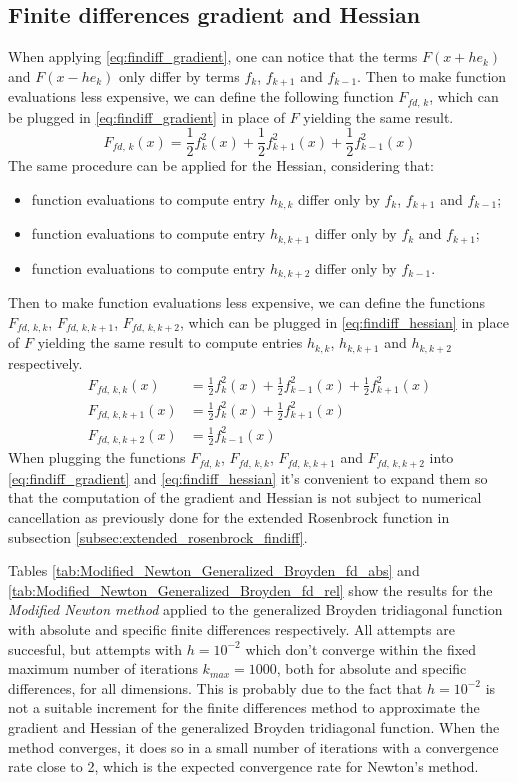 \subsection{Finite differences gradient and Hessian}

When applying \ref{eq:findiff_gradient}, one can notice that the terms $F(x + he_k)$ and $F(x-he_k)$ only differ by terms $f_k$, $f_{k+1}$ and $f_{k-1}$.
Then to make function evaluations less expensive, we can define the following function $F_{\textit{fd},\,k}$, which can be plugged in \ref{eq:findiff_gradient} in place of $F$ yielding the same result.
\[
F_{\textit{fd},\,k}(x) = \frac12 f_k^2(x) + \frac12 f_{k+1}^2(x) + \frac12 f_{k-1}^2(x)
\]
The same procedure can be applied for the Hessian, considering that:
\begin{itemize}
    \item function evaluations to compute entry $h_{k,k}$ differ only by $f_k$, $f_{k+1}$ and $f_{k-1}$;
    \item function evaluations to compute entry $h_{k,k+1}$ differ only by $f_k$ and $f_{k+1}$;
    \item function evaluations to compute entry $h_{k,k+2}$ differ only by $f_{k-1}$.
\end{itemize}
Then to make function evaluations less expensive, we can define the functions $F_{\textit{fd},\,k,k}$, $F_{\textit{fd},\,k,k+1}$, $F_{\textit{fd},\,k,k+2}$, which can be plugged in \ref{eq:findiff_hessian} in place of $F$ yielding the same result to compute entries $h_{k,k}$, $h_{k,k+1}$ and $h_{k,k+2}$ respectively.
\begin{align*}
F_{\textit{fd},\,k,k}(x) &= \frac12 f_k^2(x) + \frac12 f_{k-1}^2(x) + \frac12 f_{k+1}^2(x)\\
F_{\textit{fd},\,k,k+1}(x) &= \frac12 f_k^2(x) + \frac12 f_{k+1}^2(x)\\
F_{\textit{fd},\,k,k+2}(x) &= \frac12 f_{k-1}^2(x)
\end{align*}
When plugging the functions $F_{fd,\,k}$, $F_{fd,\,k,k}$, $F_{\textit{fd},\,k,k+1}$ and $F_{\textit{fd},\,k,k+2}$ into \ref{eq:findiff_gradient} and \ref{eq:findiff_hessian} it's convenient to expand them so that the computation of the gradient and Hessian is not subject to numerical cancellation as previously done for the extended Rosenbrock function in subsection \ref{subsec:extended_rosenbrock_findiff}.

Tables \ref{tab:Modified_Newton_Generalized_Broyden_fd_abs} and \ref{tab:Modified_Newton_Generalized_Broyden_fd_rel} show the results for the \textit{Modified Newton method} applied to the generalized Broyden tridiagonal function with absolute and specific finite differences respectively.
All attempts are succesful, but attempts with $h=10^{-2}$ which don't converge within the fixed maximum number of iterations $k_{\textit{max}}=1000$, both for absolute and specific differences, for all dimensions.
This is probably due to the fact that $h=10^{-2}$ is not a suitable increment for the finite differences method to approximate the gradient and Hessian of the generalized Broyden tridiagonal function.
When the method converges, it does so in a small number of iterations with a convergence rate close to 2, which is the expected convergence rate for Newton's method.

